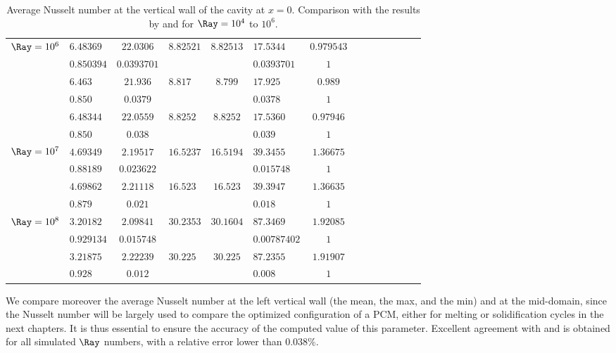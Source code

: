 \begin{table}
\begin{center}
\begin{tabular}{*{7}{cl}}
          \multirow{2}{*}{$\Ray = 10^6$} & $6.48369$ & $22.0306$ & \multirow{2}{*}{$8.82521$} & \multirow{2}{*}{$8.82513 $} & $17.5344$ & $0.979543$  \\
          & $0.850394$ & $0.0393701$ & & & $0.0393701$ & $1$ \\ 
          \multirow{2}{*}{\cite{de1983natural}} & $6.463$ & $21.936 $ & \multirow{2}{*}{$8.817$} & \multirow{2}{*}{$8.799 $} & $17.925$ & $0.989$  \\
          & $0.850$ & $0.0379$ & & & $0.0378$ & $1$ \\
          \multirow{2}{*}{\cite{LeQuere91}} & $6.48344$ & $22.0559 $ & \multirow{2}{*}{$8.8252$} & \multirow{2}{*}{$8.8252 $} & $17.5360$ & $0.97946$  \\
          & $0.850$ & $0.038$ & & & $0.039$ & $1$ \\ \hline
          
          \multirow{2}{*}{$\Ray = 10^7$} & $4.69349$ & $2.19517$ & \multirow{2}{*}{$16.5237$} & \multirow{2}{*}{$16.5194 $} & $39.3455$ & $1.36675$  \\
          & $0.88189$ & $0.023622$ & & & $0.015748$ & $1$ \\ 
          \multirow{2}{*}{\cite{LeQuere91}} & $4.69862$ & $2.21118 $ & \multirow{2}{*}{$16.523$} & \multirow{2}{*}{$16.523 $} & $39.3947$ & $1.36635$  \\
          & $0.879$ & $0.021$ & & & $0.018$ & $1$ \\ \hline

          \multirow{2}{*}{$\Ray = 10^8$} & $3.20182$ & $2.09841$ & \multirow{2}{*}{$30.2353$} & \multirow{2}{*}{$30.1604 $} & $87.3469$ & $1.92085$  \\
          & $0.929134$ & $0.015748$ & & & $0.00787402$ & $1$ \\ 
          \multirow{2}{*}{\cite{LeQuere91}} & $3.21875$ & $2.22239 $ & \multirow{2}{*}{$30.225$} & \multirow{2}{*}{$30.225 $} & $87.2355$ & $1.91907$  \\
          & $0.928$ & $0.012$ & & & $0.008$ & $1$ \\ \bottomrule
          
               \end{tabular}
   \end{center}
   \caption{Average Nusselt number at the vertical wall of the cavity at $x=0$. Comparison with the results by \cite{de1983natural} and \cite{LeQuere91} for $\Ray= 10^4$ to $10^6$.}
   \label{tab-Nu-natconv}
\end{table}
We compare moreover the average Nusselt number at the left vertical wall (the mean, the max, and the min) and at the mid-domain, 
since the Nusselt number will be largely used to compare the optimized configuration of a PCM, either for melting or solidification cycles in the next chapters.
It is thus essential to ensure the accuracy of the computed value of this parameter.
Excellent agreement with \cite{de1983natural} and \cite{LeQuere91} is obtained for all simulated $\Ray$ numbers, with a relative error lower than $0.038 \%$.


